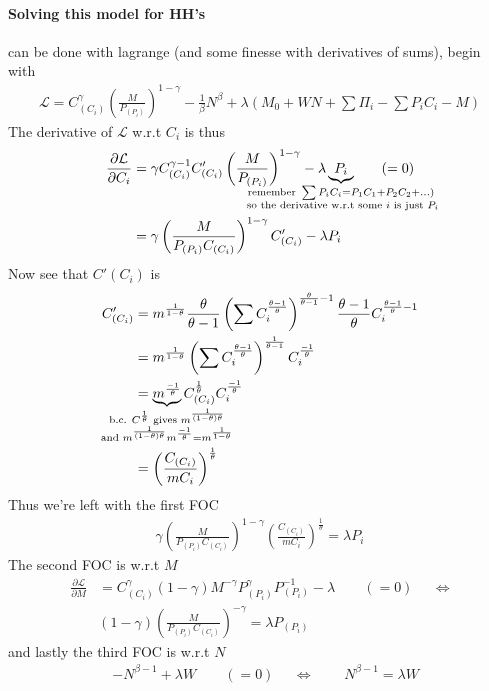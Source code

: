 \documentclass[12pt, a4paper]{article}
\begin{document}
\begin{spacing}{1.213}
\paragraph{Solving this model for HH's} can be done with lagrange (and some finesse with derivatives of sums), begin with
\begin{align*}
\mathcal{L} = C_{(C_i)}^{\gamma} \left( \frac{M}{P_{(P_i)}} \right)^{1-\gamma} - \frac{1}{\beta}N^{\beta} + \lambda \left( M_0 + WN + \sum \Pi_i - \sum P_i C_i - M \right)
\end{align*}
The derivative of $\mathcal{L}$ w.r.t $C_i$ is thus
\begin{align*}
\frac{\partial \mathcal{L}}{\partial C_i} &= \gamma C_{(C_i)}^{\gamma -1 }C'_{(C_i)} \left( \frac{M}{P_{(P_i)}}\right)^{1 - \gamma} - \lambda \underbrace{P_i}_{\mathclap{\substack{\textrm{remember } \sum P_i C_i = P_1C_1 + P_2C_2 +  ... ) \\  \textrm{ so the derivative w.r.t some } i \textrm{ is just } P_i}}} \qquad (=0)
\\
&= \gamma \left( \frac{M}{P_{(P_i)}C_{(C_i)}} \right)^{1-\gamma} C'_{(C_i)} - \lambda P_i
\end{align*}
Now see that $C'(C_i)$ is
\begin{align*}
C'_{(C_i)} &= m^{\frac{1}{1-\theta}} \frac{\theta}{\theta -1} \left( \sum C_i^{\frac{\theta -1 }{\theta}} \right)^{\frac{\theta}{\theta-1}-1} \frac{\theta-1}{\theta} C_i^{\frac{\theta -1}{\theta} -1}
\\
& = m^{\frac{1}{1-\theta}} \left( \sum C_i^{\frac{\theta -1 }{\theta}} \right)^{\frac{1}{\theta-1}} C_i^{\frac{-1}{\theta}}
\\
&= \underbrace{m^\frac{-1}{\theta}}_{\mathclap{ \substack{
\textrm{b.c. } C^{\frac{1}{\theta}} \textrm{ gives } m^{\frac{1}{(1-\theta)\theta}} \\
\textrm{and } m^{\frac{1}{(1-\theta)\theta}}m^{\frac{-1}{\theta}} = m^{\frac{1}{1-\theta}}
}}}
C_{(C_i)}^{\frac{1}{\theta}} C_i^{\frac{-1}{\theta}}
\\
& = \left( \frac{C_{(C_i)}}{m C_i} \right)^{\frac{1}{\theta}}
\end{align*}
Thus we're left with the first FOC
\begin{align*}
\gamma \left( \frac{M}{P_{(P_i)}C_{(C_i)}} \right)^{1-\gamma} \left( \frac{C_{(C_i)}}{m C_i} \right)^{\frac{1}{\theta}} = \lambda P_i
\end{align*}
The second FOC is w.r.t $M$
\begin{align*}
\frac{\partial \mathcal{L}}{\partial M} &= C_{(C_i)}^{\gamma}(1-\gamma)M^{-\gamma}P_{(P_i)}^{\gamma}P_{(P_i)}^{-1} - \lambda  \qquad (= 0) && \Leftrightarrow \\
& (1-\gamma)\left( \frac{M}{P_{(P_i)}C_{(C_i)}} \right)^{-\gamma} = \lambda P_{(P_i)}
\end{align*}
and lastly the third FOC is w.r.t $N$
\begin{align*}
&-N^{\beta-1} + \lambda W \qquad (=0) && \Leftrightarrow &&& N^{\beta-1}= \lambda W
\end{align*}


\end{spacing}
\end{document}
